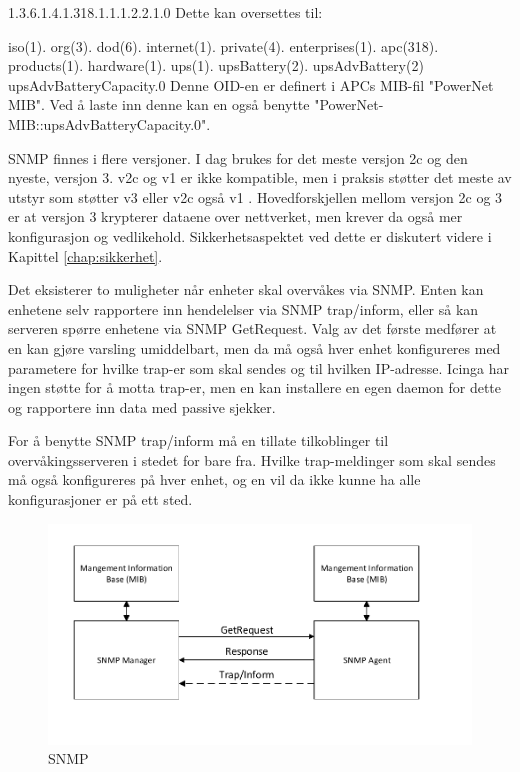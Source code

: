 1.3.6.1.4.1.318.1.1.1.2.2.1.0
Dette kan oversettes til:

iso(1). org(3). dod(6). internet(1). private(4). enterprises(1). apc(318). products(1). hardware(1). ups(1). upsBattery(2). upsAdvBattery(2) upsAdvBatteryCapacity.0
Denne OID-en er definert i APCs MIB-fil "PowerNet MIB". Ved å laste inn denne kan en også benytte "PowerNet-MIB::upsAdvBatteryCapacity.0".

SNMP finnes i flere versjoner. I dag brukes for det meste versjon 2c og den nyeste, versjon 3. v2c og v1 er ikke kompatible, men i praksis støtter det meste av utstyr som støtter v3 eller v2c også v1 \cite{rfc3584}. Hovedforskjellen mellom versjon 2c og 3 er at versjon 3 krypterer dataene over nettverket, men krever da også mer konfigurasjon og vedlikehold. Sikkerhetsaspektet ved dette er diskutert videre i Kapittel \ref{chap:sikkerhet}. 

Det eksisterer to muligheter når enheter skal overvåkes via SNMP. Enten kan enhetene selv rapportere inn hendelelser via SNMP trap/inform, eller så kan serveren spørre enhetene via SNMP GetRequest. Valg av det første medfører at en kan gjøre varsling umiddelbart, men da må også hver enhet konfigureres med parametere for hvilke trap-er som skal sendes og til hvilken IP-adresse. Icinga har ingen støtte for å motta trap-er, men en kan installere en egen daemon for dette og rapportere inn data med passive sjekker. 

For å benytte SNMP trap/inform må en tillate tilkoblinger til overvåkingsserveren i stedet for bare fra. Hvilke trap-meldinger som skal sendes må også konfigureres på hver enhet, og en vil da ikke kunne ha alle konfigurasjoner er på ett sted.

\begin{figure}[H]
    \centering
    \includegraphics{img/SNMP}
    \caption{SNMP}
    \label{SNMP}
\end{figure}


